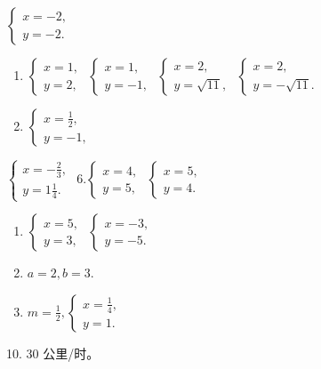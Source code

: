 \(\left\{ \begin{array}{l} x = -2, \\ y = -2. \end{array} \right.\)
\begin{enumerate}[start=4]
\item
  \(\left\{ \begin{array}{l} x = 1, \\ y = 2, \end{array} \right.\) \(\left\{ \begin{array}{l} x = 1, \\ y = -1, \end{array} \right.\) \(\left\{ \begin{array}{l} x = 2, \\ y = \sqrt{11}, \end{array} \right.\) \(\left\{ \begin{array}{l} x = 2, \\ y = -\sqrt{11}. \end{array} \right.\)
\item
  \(\left\{ \begin{array}{l} x = \frac{1}{2}, \\ y = -1, \end{array} \right.\)
\end{enumerate}

\(\left\{ \begin{array}{l} x = -\frac{2}{3}, \\ y = 1\frac{1}{4}. \end{array} \right.\)
6.\(\left\{ \begin{array}{l} x = 4, \\ y = 5, \end{array} \right.\) \(\left\{ \begin{array}{l} x = 5, \\ y = 4. \end{array} \right.\)
\begin{enumerate}[start=7]
\item
  \(\left\{ \begin{array}{l} x = 5, \\ y = 3, \end{array} \right.\) \(\left\{ \begin{array}{l} x = -3, \\ y = -5. \end{array} \right.\)
\item
  \(a = 2, b = 3.\)
\item
  \(m = \frac{1}{2}, \left\{ \begin{array}{l} x = \frac{1}{4}, \\ y = 1. \end{array} \right.\)
\end{enumerate}
10. 30 公里/时。

